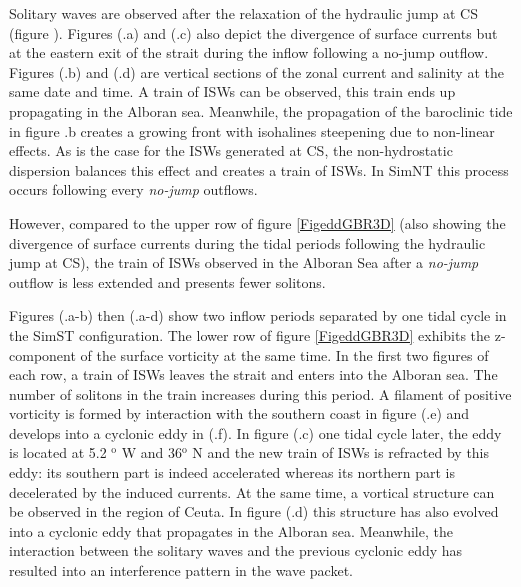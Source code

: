 Solitary waves are observed  \color{blue}after the relaxation of the hydraulic jump at CS (figure ). Figures (.a) and (.c) also depict the divergence of surface currents but at the eastern exit of the strait during the \color{black} inflow following a no-jump outflow. Figures (.b) and (.d) are vertical sections of the zonal current and salinity at the same date and time. A train of ISWs can be observed, this train ends up propagating in the Alboran sea. Meanwhile, the propagation of the baroclinic tide in figure .b creates a growing front \color{black} with isohalines steepening due to non-linear effects. As is the case for the ISWs generated at CS, the non-hydrostatic dispersion balances this effect and creates a train of ISWs. In SimNT this process occurs following every \textit{no-jump} outflows.

\color{blue}However, compared to the upper row of figure \ref{FigeddGBR3D} (also showing the divergence of surface currents during the tidal periods following the hydraulic jump at CS), the train of ISWs observed in the Alboran Sea after a \textit{no-jump} outflow is less extended and presents fewer solitons.  \color{black}

Figures (.a-b) then (.a-d) show two inflow periods separated by one tidal cycle in the SimST configuration. The lower row of \color{blue} figure \ref{FigeddGBR3D} exhibits the z-component of the surface vorticity \color{black} at the same time. In the first two figures of each row, a train of ISWs leaves the strait \color{blue} and enters into the Alboran sea. The number of solitons in the train increases during this period. \color{black} A filament of positive vorticity is formed by interaction with the southern coast in figure (.e) and develops into a cyclonic eddy in (.f).  \color{blue}In figure (.c) one tidal cycle later, the eddy is located at 5.2 $^\text{o}$ W and 36$^\text{o}$ N and the new train of ISWs is refracted by this eddy: its southern part is indeed accelerated whereas its northern part is decelerated by the induced currents. At the same time, a vortical structure can be observed in the region of Ceuta. In figure (.d) this structure has also evolved into \color{black} a cyclonic eddy that propagates in the Alboran sea. Meanwhile, the interaction between the solitary waves and the previous cyclonic eddy has resulted into an interference pattern in the wave packet. 

